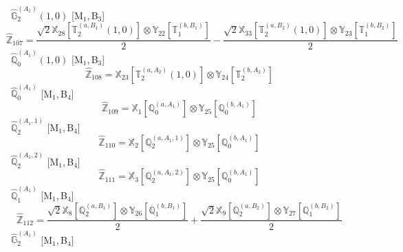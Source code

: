 \documentclass[fleqn,10pt,landscape]{article}
\begin{document}
\begin{itemize}
\begin{dmath*}
\end{dmath*}
\vspace{4mm}
\noindent {} $\,\,\,\hat{\mathbb{G}}_{2}^{(A_{1})}(1,0)$ [M$_{1}$,\,B$_{3}$]
\begin{dmath*}
\hat{\mathbb{Z}}_{107}=\frac{\sqrt{2} \mathbb{X}_{28}[\mathbb{T}_{2}^{(a,B_{1})}(1,0)] \otimes\mathbb{Y}_{22}[\mathbb{T}_{1}^{(b,B_{1})}]}{2} - \frac{\sqrt{2} \mathbb{X}_{33}[\mathbb{T}_{2}^{(a,B_{2})}(1,0)] \otimes\mathbb{Y}_{23}[\mathbb{T}_{1}^{(b,B_{2})}]}{2}
\end{dmath*}
\vspace{4mm}
\noindent {} $\,\,\,\hat{\mathbb{Q}}_{0}^{(A_{1})}(1,0)$ [M$_{1}$,\,B$_{3}$]
\begin{dmath*}
\hat{\mathbb{Z}}_{108}=\mathbb{X}_{23}[\mathbb{T}_{2}^{(a,A_{2})}(1,0)] \otimes\mathbb{Y}_{24}[\mathbb{T}_{2}^{(b,A_{2})}]
\end{dmath*}
\vspace{4mm}
\noindent {} $\,\,\,\hat{\mathbb{Q}}_{0}^{(A_{1})}$ [M$_{1}$,\,B$_{4}$]
\begin{dmath*}
\hat{\mathbb{Z}}_{109}=\mathbb{X}_{1}[\mathbb{Q}_{0}^{(a,A_{1})}] \otimes\mathbb{Y}_{25}[\mathbb{Q}_{0}^{(b,A_{1})}]
\end{dmath*}
\vspace{4mm}
\noindent {} $\,\,\,\hat{\mathbb{Q}}_{2}^{(A_{1},1)}$ [M$_{1}$,\,B$_{4}$]
\begin{dmath*}
\hat{\mathbb{Z}}_{110}=\mathbb{X}_{2}[\mathbb{Q}_{2}^{(a,A_{1},1)}] \otimes\mathbb{Y}_{25}[\mathbb{Q}_{0}^{(b,A_{1})}]
\end{dmath*}
\vspace{4mm}
\noindent {} $\,\,\,\hat{\mathbb{Q}}_{2}^{(A_{1},2)}$ [M$_{1}$,\,B$_{4}$]
\begin{dmath*}
\hat{\mathbb{Z}}_{111}=\mathbb{X}_{3}[\mathbb{Q}_{2}^{(a,A_{1},2)}] \otimes\mathbb{Y}_{25}[\mathbb{Q}_{0}^{(b,A_{1})}]
\end{dmath*}
\vspace{4mm}
\noindent {} $\,\,\,\hat{\mathbb{Q}}_{1}^{(A_{1})}$ [M$_{1}$,\,B$_{4}$]
\begin{dmath*}
\hat{\mathbb{Z}}_{112}=\frac{\sqrt{2} \mathbb{X}_{8}[\mathbb{Q}_{2}^{(a,B_{1})}] \otimes\mathbb{Y}_{26}[\mathbb{Q}_{1}^{(b,B_{1})}]}{2} + \frac{\sqrt{2} \mathbb{X}_{9}[\mathbb{Q}_{2}^{(a,B_{2})}] \otimes\mathbb{Y}_{27}[\mathbb{Q}_{1}^{(b,B_{2})}]}{2}
\end{dmath*}
\vspace{4mm}
\noindent {} $\,\,\,\hat{\mathbb{G}}_{2}^{(A_{1})}$ [M$_{1}$,\,B$_{4}$]

\end{itemize}
\end{document}
